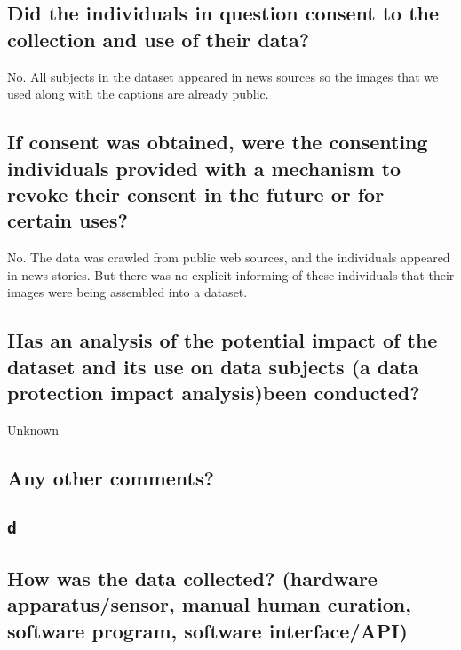 \subsection*{Did the individuals in question consent to the collection and use of their data?}

\noindent No. All subjects in the dataset appeared in news sources so the
images that we used along with the captions are already public.

\subsection*{If consent was obtained, were the consenting individuals provided with a mechanism to revoke their consent in the future or for certain uses?}
\noindent No. The data was crawled from public web sources, and the individuals appeared in news stories. But there was no explicit informing of these individuals that their images were being assembled into a dataset.

\subsection*{Has an analysis of the potential impact of the dataset and its use on data subjects (\eg a data protection impact analysis)been conducted?}
\noindent Unknown

\subsection*{Any other comments?}
\noindent 

\subsection*{\texttt{d}}
\noindent 

\subsection*{How was the data collected? (\eg hardware apparatus/sensor, manual human curation, software program, software interface/API)}
\noindent


